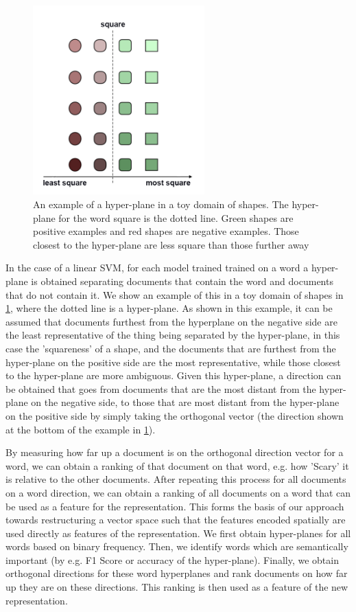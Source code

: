 \begin{figure}[t]
	\includegraphics[width=250px]{images/Toyhyperplane1Direction.png}
	\centering
	\caption{An example of a hyper-plane in a toy domain of shapes. The hyper-plane for the word square is the dotted line. Green shapes are positive examples and red shapes are negative examples. Those closest to the hyper-plane are less square than those further away}\label{ch3:HyperPlaneNoDir}
\end{figure}



 In the case of a linear SVM, for each model trained trained on a word a hyper-plane is obtained separating documents that contain the word and documents that do not contain it. We show an example of this in a toy domain of shapes in \ref{ch3:HyperPlaneNoDir}, where the dotted line is a hyper-plane. As shown in this example, it can be assumed that documents furthest from the hyperplane on the negative side are the least representative of the thing being separated by the hyper-plane, in this case the 'squareness' of a shape, and the documents that are furthest from the hyper-plane on the positive side are the most representative, while those closest to the hyper-plane are more ambiguous. Given this hyper-plane, a direction can be obtained  that goes from documents that are the most distant from the hyper-plane on the negative side, to those that are most distant from the hyper-plane on the positive side by simply taking the orthogonal vector (the direction shown at the bottom of the example in \ref{ch3:HyperPlaneNoDir}).

By measuring how far up a document is on the orthogonal direction vector for a word, we can obtain a ranking of that document on that word, e.g. how 'Scary' it is relative to the other documents. After repeating this process for all documents on a word direction, we can obtain a ranking of all documents on a word that can be used as a feature for the representation. This forms the basis of our approach towards restructuring a vector space such that the features encoded spatially are used directly as features of the representation. We first obtain hyper-planes for all words based on binary frequency. Then, we identify words which are semantically important (by e.g. F1 Score or accuracy of the hyper-plane). Finally, we obtain orthogonal directions for these word hyperplanes and rank documents on how far up they are on these directions. This ranking is then used as a feature of the new representation.

